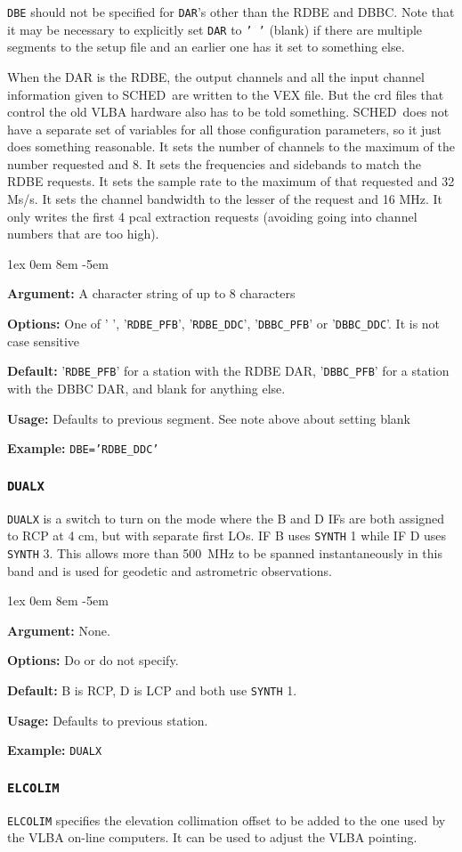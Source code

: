\documentclass{report}
\newcommand{\schedb}{{\sc SCHED~}}
\newcommand{\rcwbox}[5]{
  \begin{list}{}{\parsep 1ex  \itemsep 0em
                 \leftmargin 8em  \itemindent -5em }
    \item {\bf Argument:} #1
    \item {\bf Options:}  #2
    \item {\bf Default:}  #3
    \item {\bf Usage:}    #4
    \item {\bf Example:}  #5
  \end{list}
}
\begin{document}
{\tt DBE} should not be specified for {\tt DAR}'s other than the RDBE
and DBBC.  Note that it may be necessary to explicitly set {\tt DAR}
to {\tt ' '} (blank) if there are multiple segments to the setup file
and an earlier one has it set to something else.

When the DAR is the RDBE, the output channels and all the input channel
information given to \schedb are written to the VEX file.  But the crd
files that control the old VLBA hardware also has to be told something.
\schedb does not have a separate set of variables for all those configuration
parameters, so it just does something reasonable.  It sets the number of
channels to the maximum of the number requested and 8.  It sets the
frequencies and sidebands to match the RDBE requests.  It sets the
sample rate to the maximum of that requested and 32 Ms/s.  It sets the
channel bandwidth to the lesser of the request and 16 MHz.  It only
writes the first 4 pcal extraction requests (avoiding going into
channel numbers that are too high).

\rcwbox
{A character string of up to 8 characters}
{One of ' ', '{\tt RDBE\_PFB}', '{\tt RDBE\_DDC}', '{\tt DBBC\_PFB}' or
'{\tt DBBC\_DDC}'. It is not case sensitive}
{'{\tt RDBE\_PFB}' for a station with the RDBE DAR, '{\tt DBBC\_PFB}' 
for a station with the DBBC DAR, and blank for anything else.}
{Defaults to previous segment.  See note above about setting blank}
{{\tt DBE='RDBE\_DDC'}}


\subsubsection{\label{SP:DUALX}{\tt DUALX}}

{\tt DUALX} is a switch to turn on the mode where the B and D IFs
are both assigned to RCP at 4 cm, but with separate first LOs. IF B
uses {\tt SYNTH} 1 while IF D uses {\tt SYNTH} 3. This allows more
than 500~MHz to be spanned instantaneously in this band and is used
for geodetic and astrometric observations.

\rcwbox
{None.}
{Do or do not specify.}
{B is RCP, D is LCP and both use {\tt SYNTH} 1.}
{Defaults to previous station.}
{{\tt DUALX}}


\subsubsection{\label{SP:ELCOLIM}{\tt ELCOLIM}}

{\tt ELCOLIM} specifies the elevation collimation offset to be added to
the one used by the VLBA on-line computers.  It can be used to adjust
the VLBA pointing.
\end{document}
